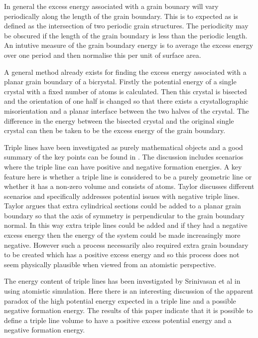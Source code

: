 \documentclass[12pt,a4paper]{book}
\begin{document}
In general the excess energy associated with a grain bounary will vary periodically along the length of the grain boundary. This is to expected as is defined as the intersection of two periodic grain structures. The periodicity may be obscured if the length of the grain boundary is less than the periodic length. An intutive measure of the grain boundary energy is to average the excess energy over one period and then normalise this per unit of surface area.

A general method already exists for finding the excess energy associated with a planar grain boundary of a bicrystal. Firstly the potential energy of a single crystal with a fixed number of atoms is calculated. Then this crystal is bisected and the orientation of one half is changed so that there exists a crystallographic misorientation and a planar interface between the two halves of the crystal. The difference in the energy between the bisected crystal and the original single crystal can then be taken to be the excess energy of the grain boundary.

 
Triple lines have been investigated as purely mathematical objects and a good summary of the key points can be found in \cite{Taylor1999}. The discussion includes scenarios where the triple line can have positive and negative formation energies. A key feature here is whether a triple line is considered to be a purely geometric line or whether it has a non-zero volume and consists of atoms. Taylor discusses different scenarios and specifically addresses potential issues with negative triple lines. Taylor argues that extra cylindrical sections could be added to a planar grain boundary so that the axis of symmetry is perpendicular to the grain boundary normal. In this way extra triple lines could be added and if they had a negative excess energy then the energy of the system could be made increasingly more negative. However such a process necessarily also required extra grain boundary to be created which has a positive excess energy and so this process does not seem physically plausible when viewed from an atomistic perspective.


The energy content of triple lines has been investigated by Srinivasan et al in \cite{Srinivasan1999} using atomistic simulation. Here there is an interesting discussion of the apparent paradox of the high potential energy expected in a triple line and a possible negative formation energy. The results of this paper indicate that it is possible to define a triple line volume to have a positive excess potential energy and a negative formation energy. 
\end{document}
